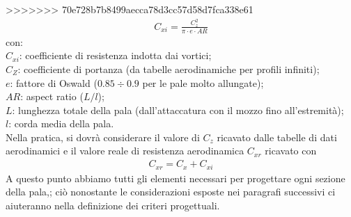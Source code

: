 >>>>>>> 70e728b7b8499aecca78d3cc57d58d7fca338e61
\begin{align*}
C_{xi} = \frac{C_z^2}{\pi \cdot e \cdot AR}
\end{align*}
con:\\[1mm]
$C_{xi}$: coefficiente di resistenza indotta dai vortici;\\
$C_Z$: coefficiente di portanza (da tabelle aerodinamiche per profili infiniti);\\
$e$: fattore di Oswald ($0.85 \div 0.9$ per le pale molto allungate);\\
$AR$: aspect ratio ($L/l$);\\
$L$: lunghezza totale della pala (dall'attaccatura con il mozzo fino all'estremità);\\
$l$: corda media della pala.\\[1mm]
Nella pratica, si dovrà considerare il valore di $C_z$ ricavato dalle tabelle di dati aerodinamici e il valore reale di resistenza aerodinamica $C_{xr}$ ricavato con
\begin{align*}
C_{xr} = C_x + C_{xi}
\end{align*}
A questo punto abbiamo tutti gli elementi necessari per progettare ogni sezione della pala,; ciò nonostante le considerazioni esposte nei paragrafi successivi ci aiuteranno nella definizione dei criteri progettuali.

